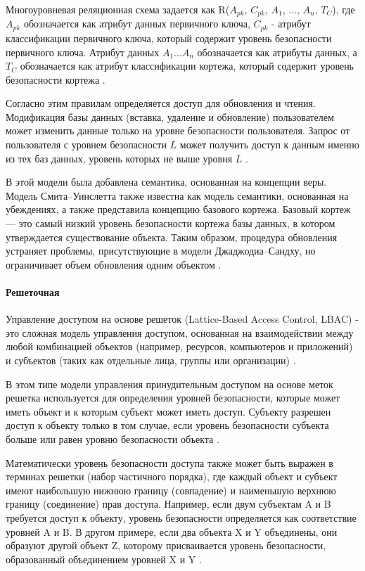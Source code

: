 Многоуровневая реляционная схема задается как R($A_{pk}$, $C_{pk}$, $A_1$, ..., $A_{n}$, $T_C$), где $A_{pk}$ обозначается как атрибут данных первичного ключа, $C_{pk}$ - атрибут классификации первичного ключа, который содержит уровень безопасности первичного ключа. Атрибут данных $A_{1} ... A_{n}$ обозначается как атрибуты данных, а $T_C$ обозначается как атрибут классификации кортежа, который содержит уровень безопасности кортежа \autocite{Osama}.

Согласно этим правилам определяется доступ для обновления и чтения. Модификация базы данных (вставка, удаление
и обновление) пользователем может изменить данные только на уровне безопасности пользователя. Запрос от пользователя
с уровнем безопасности $L$ может получить доступ к данным именно из тех баз данных, уровень которых не выше уровня $L$
\autocite{Osama}.

В этой модели была добавлена семантика, основанная на концепции веры. Модель Смита–Уинслетта также известна как
модель семантики, основанная на убеждениях, а также представила концепцию базового кортежа. Базовый кортеж ---
это самый низкий уровень безопасности кортежа базы данных, в котором утверждается существование объекта.
Таким образом, процедура обновления устраняет проблемы, присутствующие в модели Джаджодиа–Сандху, но ограничивает
объем обновления одним объектом \autocite{Osama}.

\paragraph{Решеточная}

Управление доступом на основе решеток (Lattice-Based Access Control, LBAC) - это сложная модель управления доступом,
основанная на взаимодействии между любой комбинацией объектов (например, ресурсов, компьютеров и приложений) и
субъектов (таких как отдельные лица, группы или организации) \autocite{LBAC}.

В этом типе модели управления принудительным доступом на основе меток решетка используется для определения уровней
безопасности, которые может иметь объект и к которым субъект может иметь доступ. Субъекту разрешен доступ к объекту
только в том случае, если уровень безопасности субъекта больше или равен уровню безопасности объекта \autocite{LBAC}.

Математически уровень безопасности доступа также может быть выражен в терминах решетки (набор частичного порядка),
где каждый объект и субъект имеют наибольшую нижнюю границу (совпадение) и наименьшую верхнюю границу (соединение)
прав доступа. Например, если двум субъектам A и B требуется доступ к объекту, уровень безопасности определяется как
соответствие уровней A и B. В другом примере, если два объекта X и Y объединены, они образуют другой объект Z,
которому присваивается уровень безопасности, образованный объединением уровней X и Y \autocite{LBAC}.

